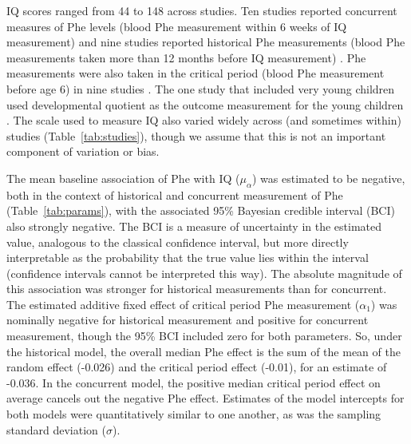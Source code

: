 \documentclass{svjour3}                     %
\begin{document}
IQ scores ranged from 44 to 148 across studies. Ten studies reported concurrent measures of Phe levels (blood Phe measurement within 6 weeks of IQ measurement) \citep{Azadi:2009ha, Cerone:1999vf, Jones:1995vw, Ris:1997vv, Rupp:2001jg, Schmidt:1994wx, Viau:2011he, WASSERSTEIN:2006bv, Weglage:2000wf, Welsh:1990uw} and nine studies reported historical Phe measurements (blood Phe measurements taken more than 12 months before IQ measurement) \citep{Leuzzi:1998um,Pfaendner:2005uo, Rupp:2001jg, Seashore:1985wf, WASSERSTEIN:2006bv, Viau:2011he, Weglage:1999tr, Weglage:2001us, Welsh:1990uw}. Phe measurements were also taken in the critical period (blood Phe measurement before age 6) in nine studies \citep{Anastasoaie:2008hv, Griffiths:2000ti, Pfaendner:2005uo, Seashore:1985wf, Viau:2011he, WASSERSTEIN:2006bv, Weglage:2000wf, Weglage:2001us, Welsh:1990uw}. The one study that included very young children used developmental quotient as the outcome measurement for the young children \citep{Anastasoaie:2008hv}. The scale used to measure IQ also varied widely across (and sometimes within) studies (Table~\ref{tab:studies}), though we assume that this is not an important component of variation or bias.

The mean baseline association of Phe with IQ ($\mu_{\alpha}$) was estimated to be negative, both in the context of historical and concurrent measurement of Phe (Table~\ref{tab:params}), with the associated 95\% Bayesian credible interval (BCI) also strongly negative. The BCI is a measure of uncertainty in the estimated value, analogous to the classical confidence interval, but more directly interpretable as the probability that the true value lies within the interval (confidence intervals cannot be interpreted this way). The absolute magnitude of this association was stronger for historical measurements than for concurrent. The estimated additive fixed effect of critical period Phe measurement ($\alpha_1$) was nominally negative for historical measurement and positive for concurrent measurement, though the 95\% BCI included zero for both parameters. So, under the historical model, the overall median Phe effect is the sum of the mean of the random effect (-0.026) and the critical period effect (-0.01), for an estimate of -0.036. In the concurrent model, the positive median critical period effect on average cancels out the negative  Phe effect. Estimates of the model intercepts for both models were quantitatively similar to one another, as was the sampling standard deviation ($\sigma$).
\end{document}
